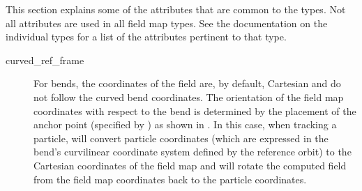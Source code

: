 This section explains some of the attributes that are common to the 
types. Not all attributes are used in all field map types. See the documentation on the
individual types for a list of the attributes pertinent to that type.

  \begin{description}
%
\item[curved_ref_frame] \Newline
For bends, the coordinates of the field are, by default, Cartesian and do not follow the
curved bend coordinates. The orientation of the field map coordinates with respect to the
bend is determined by the placement of the anchor point (specified by )
as shown in . In this case, when tracking a particle, \bmad will convert
particle coordinates (which are expressed in the bend's curvilinear coordinate system
defined by the reference orbit) to the Cartesian coordinates of the field map and will
rotate the computed field from the field map coordinates back to the particle coordinates.


\end{description}
